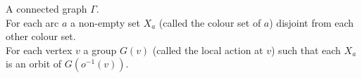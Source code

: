 \documentclass[preview]{standalone}
\begin{document}
A connected graph $\Gamma$.\\For each arc $a$ a non-empty set $X_a$ (called the colour set of $a$) disjoint from each other colour set.\\For each vertex $v$ a group $G(v)$ (called the local action at $v$) such that each $X_a$ is an orbit of $G(o^{-1}(v))$.\\
\end{document}
